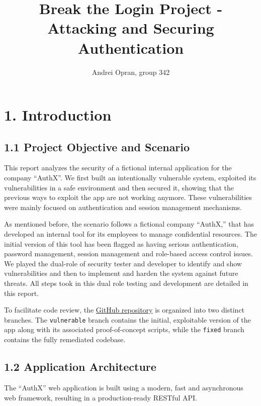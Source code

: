 \documentclass[11pt]{article}
\title{\textbf{Break the Login Project - Attacking and Securing Authentication}}
\author{Andrei Opran, group 342}
\date{}
\begin{document}
\maketitle

\section*{1. Introduction}

\subsection*{1.1 Project Objective and Scenario}

This report analyzes the security of a fictional internal application for the company ``AuthX''. We first built an intentionally vulnerable system, exploited its vulnerabilities in a safe environment and then secured it,
showing that the previous ways to exploit the app are not working anymore. These vulnerabilities were mainly focused on authentication and session management mechanisms.

As mentioned before, the scenario follows a fictional company ``AuthX,'' that has developed an internal tool for its employees to manage confidential resources. The initial version of this tool has been flagged as having serious authentication, password management, session management and role-based access control issues. We played the dual-role of security tester and developer to identify and show vulnerabilities and then to implement and harden the system against future threats. All steps took in this dual role testing and development are detailed in this report.

To facilitate code review, the \href{https://github.com/andreiOpran/break-the-login}{GitHub repository} is organized into two distinct branches. The \texttt{vulnerable} branch contains the initial, exploitable version of the app along with its associated proof-of-concept scripts, while the \texttt{fixed} branch contains the fully remediated codebase.

\subsection*{1.2 Application Architecture}

The ``AuthX'' web application is built using a modern, fast and asynchronous web framework, resulting in a production-ready RESTful API.
\end{document}
